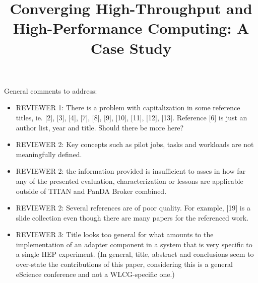 \documentclass[conference]{IEEEtran}
\begin{document}
\title{Converging High-Throughput and High-Performance Computing: A Case Study}

\author{
}


\maketitle

\ifreview
General comments to address:
\begin{itemize}
    \color{red} 
    \item REVIEWER 1: There is a problem with capitalization in some
    reference titles, ie. [2], [3], [4], [7], [8], [9], [10], [11], [12],
    [13]. Reference [6] is just an author list, year and title. Should there
    be more here?
    \item REVIEWER 2:  Key concepts such as pilot jobs, tasks and workloads
    are not meaningfully defined.
    \item REVIEWER 2: the information provided is insufficient to asses in
    how far any of the presented evaluation, characterization or lessons are
    applicable outside of TITAN and PanDA Broker combined.
    \item REVIEWER 2: Several references are of poor quality. For example,
    [19] is a slide collection even though there are many papers for the
    referenced work.
    \item REVIEWER 3: Title looks too general for what amounts to the
    implementation of an adapter component in a system that is very specific
    to a single HEP experiment. (In general, title, abstract and conclusions
    seem to over-state the contributions of this paper, considering this is a
    general eScience conference and not a WLCG-specific one.)
\end{itemize}
\fi
\end{document}
